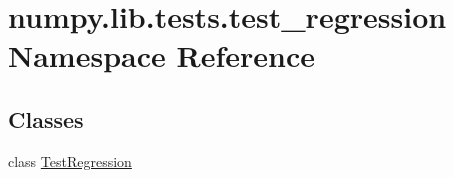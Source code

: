 \hypertarget{namespacenumpy_1_1lib_1_1tests_1_1test__regression}{}\section{numpy.\+lib.\+tests.\+test\+\_\+regression Namespace Reference}
\label{namespacenumpy_1_1lib_1_1tests_1_1test__regression}
\subsection*{Classes}
\begin{DoxyCompactItemize}
\item 
class \hyperlink{classnumpy_1_1lib_1_1tests_1_1test__regression_1_1TestRegression}{Test\+Regression}
\end{DoxyCompactItemize}
